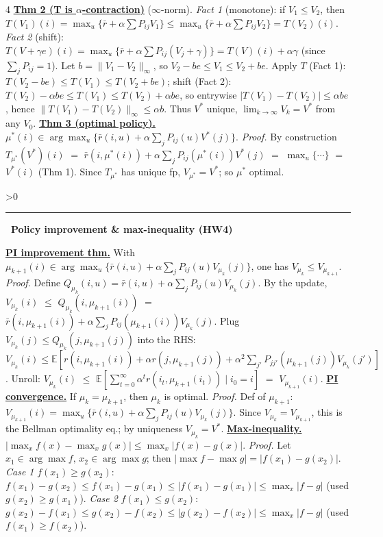 \documentclass[10pt,landscape,letterpaper]{article}
\let\oldtextbf\textbf
\renewcommand{\textbf}[1]{\uline{\oldtextbf{#1}}}
\renewcommand{\section}[1]{%
  \ifnum\value{section}>0\par\vspace{1pt}\hrule\vspace{1pt}\fi
  \refstepcounter{section}\oldtextbf{\thesection\ #1}\ }
\begin{document}
\begin{multicols*}{4}
\textbf{Thm 2 (T is \(\alpha\)-contraction)} (\(\infty\)-norm).
\emph{Fact 1} (monotone): if \(V_1\le V_2\), then
\(T(V_1)(i){=}\max_u\{\bar r{+}\alpha\!\sum\!P_{ij}V_1\}\le\max_u\{\bar r{+}\alpha\!\sum\!P_{ij}V_2\}{=}T(V_2)(i)\).
\emph{Fact 2} (shift): \(T(V{+}\gamma e)(i){=}\max_u\{\bar r{+}\alpha\!\sum\!P_{ij}(V_j{+}\gamma)\}{=}T(V)(i){+}\alpha\gamma\)
(since \(\sum_j P_{ij}{=}1\)).
Let \(b{=}\|V_1{-}V_2\|_\infty\), so \(V_2{-}be\le V_1\le V_2{+}be\).
Apply \(T\) (Fact 1): \(T(V_2{-}be)\le T(V_1)\le T(V_2{+}be)\); shift (Fact 2): \(T(V_2){-}\alpha be\le T(V_1)\le T(V_2){+}\alpha be\), so entrywise \(|T(V_1){-}T(V_2)|\le\alpha be\), hence \(\|T(V_1){-}T(V_2)\|_\infty\le\alpha b\). Thus \(V^*\) unique, \(\lim_{k\to\infty}V_k=V^*\) from any \(V_0\).
\textbf{Thm 3 (optimal policy).}
\(\mu^*(i)\in\arg\max_u\{\bar r(i,u)+\alpha\!\sum_j\!P_{ij}(u)V^*(j)\}\).
\emph{Proof.} By construction \(T_{\mu^*}(V^*)(i)\) \(=\) \(\bar r(i,\mu^*(i))+\alpha\!\sum_j\!P_{ij}(\mu^*(i))V^*(j)\) \(=\) \(\max_u\{\cdots\}\) \(=\) \(V^*(i)\) (Thm 1). Since \(T_{\mu^*}\) has unique fp, \(V_{\mu^*}=V^*\); so \(\mu^*\) optimal.

\section{Policy improvement \& max-inequality (HW4)}

\textbf{PI improvement thm.} With \(\mu_{k+1}(i)\in\arg\max_u\{\bar r(i,u)+\alpha\!\sum_j\!P_{ij}(u)V_{\mu_k}(j)\}\),
one has \(V_{\mu_k}\le V_{\mu_{k+1}}\).
\emph{Proof.} Define \(Q_{\mu_k}(i,u){=}\bar r(i,u)+\alpha\!\sum_j\!P_{ij}(u)V_{\mu_k}(j)\). By the update, \(V_{\mu_k}(i)\) \(\le\) \(Q_{\mu_k}(i,\mu_{k+1}(i))\) \(=\) \(\bar r(i,\mu_{k+1}(i))+\alpha\!\sum_j\!P_{ij}(\mu_{k+1}(i))V_{\mu_k}(j)\). Plug \(V_{\mu_k}(j)\le Q_{\mu_k}(j,\mu_{k+1}(j))\) into the RHS: \(V_{\mu_k}(i)\le\mathbb E[r(i,\mu_{k+1}(i))+\alpha r(j,\mu_{k+1}(j))+\alpha^2\!\sum_{j'}\!P_{jj'}(\mu_{k+1}(j))V_{\mu_k}(j')]\). Unroll: \(V_{\mu_k}(i)\) \(\le\) \(\mathbb E[\sum_{t=0}^\infty\alpha^t r(i_t,\mu_{k+1}(i_t))\!\mid\!i_0{=}i]\) \(=\) \(V_{\mu_{k+1}}(i)\).
\textbf{PI convergence.} If \(\mu_k=\mu_{k+1}\), then \(\mu_k\) is optimal.
\emph{Proof.} Def of \(\mu_{k+1}\): \(V_{\mu_{k+1}}(i)=\max_u\{\bar r(i,u)+\alpha\!\sum_j\!P_{ij}(u)V_{\mu_k}(j)\}\).
Since \(V_{\mu_k}=V_{\mu_{k+1}}\), this is the Bellman optimality eq.; by uniqueness \(V_{\mu_k}=V^*\).
\textbf{Max-inequality.} \(|\max_x f(x)-\max_x g(x)|\le\max_x|f(x)-g(x)|\).
\emph{Proof.} Let \(x_1\in\arg\max f,\,x_2\in\arg\max g\); then \(|\max f-\max g|=|f(x_1)-g(x_2)|\).
\emph{Case 1} \(f(x_1)\ge g(x_2)\): \(f(x_1)-g(x_2)\le f(x_1)-g(x_1)\le|f(x_1)-g(x_1)|\le\max_x|f-g|\)
(used \(g(x_2)\ge g(x_1)\)).
\emph{Case 2} \(f(x_1)\le g(x_2)\): \(g(x_2)-f(x_1)\le g(x_2)-f(x_2)\le|g(x_2)-f(x_2)|\le\max_x|f-g|\)
(used \(f(x_1)\ge f(x_2)\)).


\end{multicols*}
\end{document}
